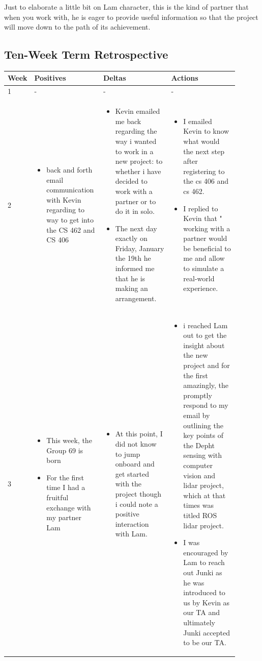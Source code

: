 \documentclass[10pt,draftclsnofoot,onecolumn,journal,compsoc]{IEEEtran}
\begin{document}
\begin{singlespace}
	Just to elaborate a little bit on Lam character, this is the kind of partner that when you work with, he is eager to provide useful information so that the project will move down to the path of its achievement.    
	\pagebreak
	 
	\subsection{Ten-Week Term Retrospective}
		\begin{longtable}{|l|p{0.3\linewidth}|p{0.3\linewidth}|p{0.3\linewidth}|}\hline \textbf{Week} & \textbf{Positives} & \textbf{Deltas} & \textbf{Actions}\\\hline
		1 	& - & - & -\\\hline

		2 	&
\begin{itemize}
\item back and forth email communication with Kevin regarding to way to get into the CS 462 and CS 406 
\end{itemize}
			&
\begin{itemize}
\item Kevin emailed me back regarding the way i wanted to work in a new project: to whether i have decided to work with a partner or to do it in solo.
\item The next day exactly on Friday, January the 19th he informed me that he is making an arrangement.
\end{itemize}
			&
\begin{itemize}
\item I emailed Kevin to know what would the next step after registering to the cs 406 and cs 462.
\item I replied to Kevin that " working with a partner would be beneficial to me and allow to simulate   a real-world experience.
\end{itemize}

			\\\hline

		3	&
\begin{itemize}
\item This week, the Group 69 is born
\item For the first time I had a fruitful exchange with my partner Lam
 
\end{itemize}
			&
\begin{itemize}
\item At this point, I did not know to jump onboard and get started with the project though i could note a positive interaction with Lam.
\end{itemize}
			&
\begin{itemize}
\item i reached Lam out to get the insight about the new project and for the first amazingly, the promptly respond to my email by outlining the key points of the Depht sensing with computer vision and lidar project, which at that times was titled ROS lidar project.
\item I was encouraged by Lam to reach out Junki as he was introduced to us by Kevin as our  TA and ultimately Junki accepted to be our TA.
 

\end{itemize}
\end{longtable}
\end{singlespace}
\end{document}
